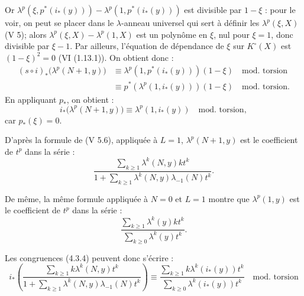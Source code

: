 Or \(\lambda^p(\xi,p^*(i_*(y)))-\lambda^p(1,p^*(i_*(y)))\) est divisible par \(1-\xi\) :
pour le voir, on peut se placer dans le \(\lambda\)-anneau universel qui sert à définir les \(\lambda^p(\xi,X)\) (V 5); alors \(\lambda^p(\xi,X)-\lambda^p(1,X)\) est un polynôme en \(\xi\), nul pour \(\xi=1\), donc divisible par \(\xi-1\). Par ailleurs, l'équation de dépendance de \(\xi\) sur \(K^\circ(X)\) est \((1-\xi)^2=0\) (VI (1.13.1)). On obtient donc :
\[
\begin{aligned}
(s\circ i)_*\bigl(\lambda^p(N+1,y)\bigr)
&\equiv \lambda^p(1,p^*(i_*(y)))(1-\xi) \quad\text{mod.\ torsion}\\
&\equiv p^*(\lambda^p(1,i_*(y)))(1-\xi) \quad\text{mod.\ torsion}.
\end{aligned}
\]
En appliquant \(p_*\), on obtient :
\begin{equation}\tag{4.3.4}
  i_*\bigl(\lambda^p(N+1,y)\bigr)
  \equiv \lambda^p(1,i_*(y)) \quad\text{mod.\ torsion},
\end{equation}
car \(p_*(\xi)=0\).

D'après la formule de (V 5.6), appliquée à \(L=1\), \(\lambda^p(N+1,y)\) est le coefficient de \(t^p\) dans la série :
\[
  \frac{\sum_{k\ge1}\lambda^k(N,y)kt^k}
       {1+\sum_{k\ge1}\lambda^k(N,y)\lambda_{-1}(N)t^k}.
\]

De même, la même formule appliquée à \(N=0\) et \(L=1\) montre que \(\lambda^p(1,y)\) est le coefficient de \(t^p\) dans la série :
\[
  \frac{\sum_{k\ge1}\lambda^k(y)kt^k}
       {\sum_{k\ge0}\lambda^k(y)t^k}.
\]

Les congruences (4.3.4) peuvent donc s'écrire :
\[
i_*\left(
  \frac{\sum_{k\ge1}k\lambda^k(N,y)t^k}
       {1+\sum_{k\ge1}\lambda^k(N,y)\lambda_{-1}(N)t^k}
\right)
\equiv
  \frac{\sum_{k\ge1}k\lambda^k(i_*(y))t^k}
       {\sum_{k\ge0}\lambda^k(i_*(y))t^k}
       \quad\text{mod.\ torsion}
\]
